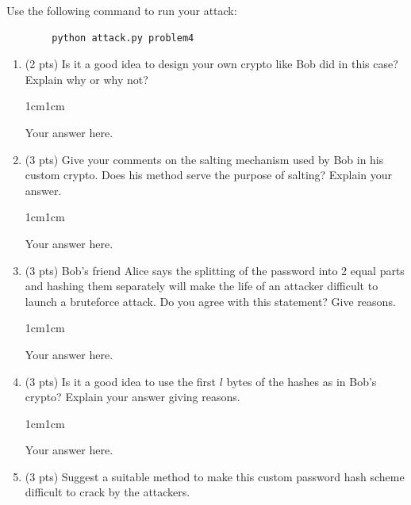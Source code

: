 \documentclass[11pt,letterpaper]{article}
\newenvironment{answer}{\em \color{blue} \begin{adjustwidth}{1cm}{1cm}}{\end{adjustwidth}}
\begin{document}
	Use the following command to run your attack:
	\begin{Verbatim}
		python attack.py problem4
	\end{Verbatim}
	
	
	\begin{enumerate}
		
		\item (2 pts) Is it a good idea to design your own crypto like Bob did in this case? Explain why or why not?
		
		\begin{answer}
			
			Your answer here.
			
		\end{answer}
		
		\item (3 pts) Give your comments on the salting mechanism used by Bob in his custom crypto. Does his method serve the purpose of salting? Explain your answer.
		
		\begin{answer}
			
			Your answer here.
			
		\end{answer}
		
		\item (3 pts)  Bob’s friend Alice says the splitting of the password into 2 equal parts and hashing them separately will make the life of an attacker difficult to launch a bruteforce attack. Do you agree with this statement? Give reasons.
		
		\begin{answer}
			
			Your answer here.
			
		\end{answer}
		
		\item (3 pts)  Is it a good idea to use the first $l$ bytes of the hashes as in Bob's crypto? Explain your answer giving reasons.
		
		\begin{answer}
			
			Your answer here.
			
		\end{answer}
		
		\item (3 pts) Suggest a suitable method to make this custom password hash scheme difficult to crack by the attackers.  
		

\end{enumerate}
\end{document}
